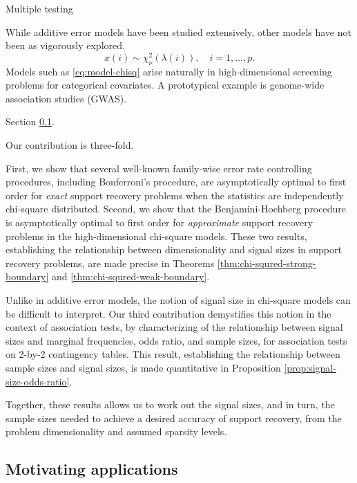 
Multiple testing

While additive error models have been studied extensively, other models have not been as vigorously explored.
\begin{equation} \label{eq:model-chisq}
    x(i) \sim \chi_\nu^2\left(\lambda(i)\right), \quad i=1,\ldots,p.
\end{equation}
Models such as \eqref{eq:model-chisq} arise naturally in high-dimensional screening problems for categorical covariates.
A prototypical example is genome-wide association studies (GWAS).

Section \ref{subsec:motivation}.


Our contribution is three-fold.

First, we show that several well-known family-wise error rate controlling procedures, including Bonferroni's procedure, are asymptotically optimal to first order for \emph{exact} support recovery problems when the statistics are independently chi-square distributed.
Second, we show that the Benjamini-Hochberg procedure is asymptotically optimal to first order for \emph{approximate} support recovery problems in the high-dimensional chi-square models.
These two results, establishing the relationship between dimensionality and signal sizes in support recovery problems, are made precise in Theorems \ref{thm:chi-squred-strong-boundary} and \ref{thm:chi-squred-weak-boundary}.

Unlike in additive error models, the notion of signal size in chi-square models can be difficult to interpret.
Our third contribution demystifies this notion in the context of association tests, by characterizing of the relationship between signal sizes and marginal frequencies, odds ratio, and sample sizes, for association tests on 2-by-2 contingency tables.
This result, establishing the relationship between sample sizes and signal sizes, is made quantitative in Proposition \ref{prop:signal-size-odds-ratio}.

Together, these results allows us to work out the signal sizes, and in turn, the sample sizes needed to achieve a desired accuracy of support recovery, from the problem dimensionality and assumed sparsity levels.

\subsection{Motivating applications}
\label{subsec:motivation}

